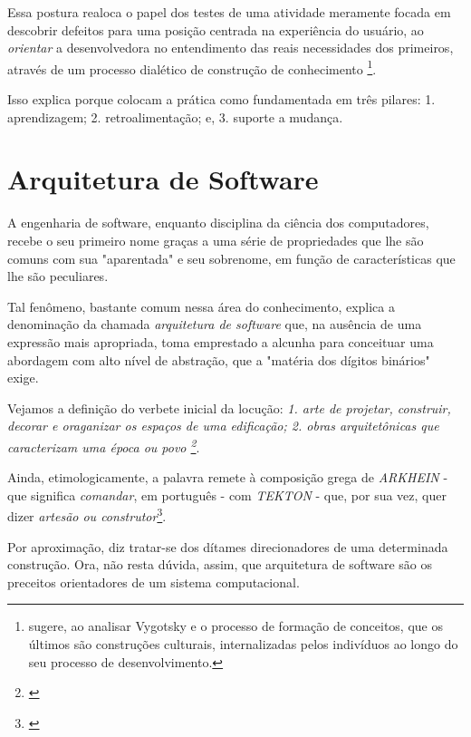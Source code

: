 \documentclass[12pt,a4paper,oneside,english,brazil]{article}
\begin{document}
      Essa postura realoca o papel dos testes de uma atividade meramente focada
      em descobrir defeitos para uma posição centrada na experiência do
      usuário, ao  \emph{orientar} a desenvolvedora no entendimento das reais
      necessidades dos primeiros, através de um processo dialético de construção
      de conhecimento \footnote{ sugere, ao
      analisar Vygotsky e o processo de formação de conceitos, que os últimos
      são construções culturais, internalizadas pelos indivíduos ao longo do seu
      processo de desenvolvimento.}.

      Isso explica porque  colocam a prática
      como fundamentada em três pilares: 1. aprendizagem; 2. retroalimentação;
      e, 3. suporte a mudança.


  \section{Arquitetura de Software}

    A engenharia de software, enquanto disciplina da ciência dos
    computadores, recebe o seu primeiro nome graças a uma série de
    propriedades que lhe são comuns com sua "aparentada" e seu
    sobrenome, em função de características que lhe são peculiares.

    Tal fenômeno, bastante comum nessa área do conhecimento, explica a
    denominação da chamada \emph{arquitetura de software} que, na ausência de
    uma expressão mais apropriada, toma emprestado a alcunha para conceituar uma
    abordagem com alto nível de abstração, que a "matéria dos dígitos binários"
    exige.

    Vejamos a definição do verbete inicial da locução: \emph{1. arte de
    projetar, construir, decorar e oraganizar os espaços de uma edificação; 2.
    obras arquitetônicas que caracterizam uma época ou povo \footnote{\cite[p.
    81]{Kury2007}}}.

    Ainda, etimologicamente, a palavra remete à composição grega de \emph{
      ARKHEIN} - que significa \emph{comandar}, em português - com \emph{TEKTON}
    - que, por sua vez, quer dizer \emph{artesão ou construtor}\footnote{\cite{
    Etimologia2019}}.

    Por aproximação, diz tratar-se dos dítames direcionadores de uma determinada
    construção. Ora, não resta dúvida, assim, que arquitetura de software são os
    preceitos orientadores de um sistema computacional.
\end{document}
